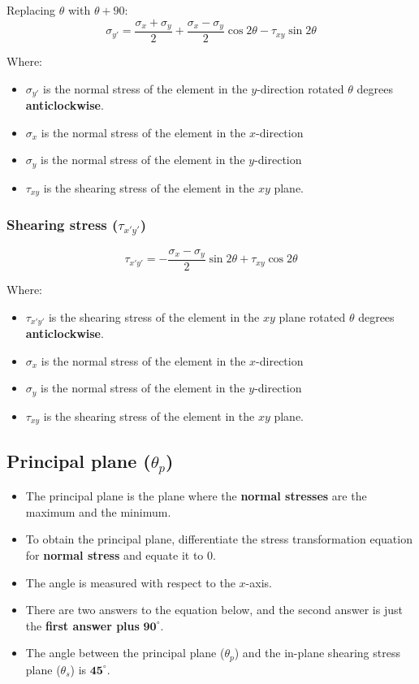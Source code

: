 \documentclass[11pt]{article}
\begin{document}
Replacing \(\theta\) with \(\theta + 90\):
\[\sigma_{y'} = \frac{\sigma_x + \sigma_y}{2} + \frac{\sigma_x - \sigma_y}{2} \cos 2 \theta - \tau_{xy} \sin 2 \theta\]

Where:
\begin{itemize}
\item \(\sigma_{y'}\) is the normal stress of the element in the \(y\)-direction rotated \(\theta\) degrees \textbf{anticlockwise}.
\item \(\sigma_x\) is the normal stress of the element in the \(x\)-direction
\item \(\sigma_y\) is the normal stress of the element in the \(y\)-direction
\item \(\tau_{xy}\) is the shearing stress of the element in the \(xy\) plane.
\end{itemize}

\subsubsection{Shearing stress (\(\tau_{x'y'}\))}
\label{sec:org9201be9}
\[\tau_{x'y'} = - \frac{\sigma_x - \sigma_y}{2} \sin 2 \theta + \tau_{xy} \cos 2 \theta\]

Where:
\begin{itemize}
\item \(\tau_{x'y'}\) is the shearing stress of the element in the \(xy\) plane rotated \(\theta\) degrees \textbf{anticlockwise}.
\item \(\sigma_x\) is the normal stress of the element in the \(x\)-direction
\item \(\sigma_y\) is the normal stress of the element in the \(y\)-direction
\item \(\tau_{xy}\) is the shearing stress of the element in the \(xy\) plane.
\end{itemize}

\subsection{Principal plane (\(\theta_p\))}
\label{sec:org7dee699}
\begin{itemize}
\item The principal plane is the plane where the \textbf{normal stresses} are the maximum and the minimum.
\item To obtain the principal plane, differentiate the stress transformation equation for \textbf{normal stress} and equate it to 0.
\item The angle is measured with respect to the \(x\)-axis.
\item There are two answers to the equation below, and the second answer is just the \textbf{first answer plus} \(\boldsymbol{90^{\circ}}\).
\item The angle between the principal plane (\(\theta_p\)) and the in-plane shearing stress plane (\(\theta_s\)) is \(\boldsymbol{45^{\circ}}\).
\end{itemize}
\end{document}
